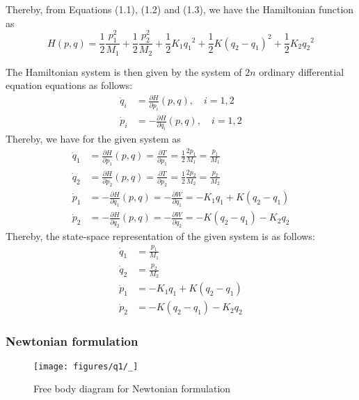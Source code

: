 Thereby, from Equations (1.1), (1.2) and (1.3), we have the Hamiltonian function as
\[
    H(p,q) =
    \frac{1}{2} \frac{p_1^2}{M_1}
    + \frac{1}{2} \frac{p_2^2}{M_2}
    + \frac{1}{2} K_1 {q_1}^2
    + \frac{1}{2} K {(q_2 - q_1)}^2
    + \frac{1}{2} K_2 {q_2}^2
    \tag{1.4}
\]

The Hamiltonian system is then given by the system of \(2n\) ordinary differential equation equations as follows:
\[
    \begin{aligned}
        \dot q_i & = \frac{\partial H}{\partial p_i}(p,q), \quad i = 1,2  \\
        \dot p_i & = -\frac{\partial H}{\partial q_i}(p,q), \quad i = 1,2
    \end{aligned}
    \tag{1.5}
\]
Thereby, we have for the given system as
\[
    \begin{aligned}
        \dot q_1 & = \frac{\partial H}{\partial p_1}(p,q) = \frac{\partial T}{\partial p_1} = \frac{1}{2}\frac{2 p_1}{M_1} = \frac{p_1}{M_1} \\
        \dot q_2 & = \frac{\partial H}{\partial p_2}(p,q) = \frac{\partial T}{\partial p_2} = \frac{1}{2}\frac{2 p_2}{M_2} = \frac{p_2}{M_2} \\
        \dot p_1 & = -\frac{\partial H}{\partial q_1}(p,q) = - \frac{\partial W}{\partial q_1} = -K_1 q_1 + K (q_2 - q_1)                    \\
        \dot p_2 & = -\frac{\partial H}{\partial q_2}(p,q) = - \frac{\partial W}{\partial q_2} = -K (q_2 - q_1) - K_2 q_2
    \end{aligned}
\]
Thereby, the state-space representation of the given system is as follows:
\[
    \boxed{
        \begin{aligned}
            \dot q_1 & = \frac{p_1}{M_1}          \\
            \dot q_2 & = \frac{p_2}{M_2}          \\
            \dot p_1 & = -K_1 q_1 + K (q_2 - q_1) \\
            \dot p_2 & = -K (q_2 - q_1) - K_2 q_2
        \end{aligned}
    }
    \tag{1.6}
\]

\subsubsection*{Newtonian formulation}

\begin{figure}[htb]
    \centering
    \texttt{[image: figures/q1/\_]}
    \caption{
        Free body diagram for Newtonian formulation
    }\label{fig:q1-newtonian}
\end{figure}
